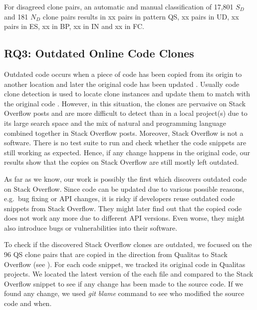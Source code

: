 \documentclass{sig-alternate-05-2015}
\begin{document}
For disagreed clone pairs, an automatic and manual classification of 17,801 $S_D$ and 181 $N_D$ clone pairs results in xx pairs in pattern QS, xx pairs in UD, xx pairs in ES, xx in BP, xx in IN and xx in FC. 

\subsection{RQ3: Outdated Online Code Clones}


Outdated code occurs when a piece of code has been copied from its origin to another location and later the original code has been updated \cite{Xia2014}. Usually code clone detection is used to locate clone instances and update them to match with the original code \cite{Bellon2007}. However, in this situation, the clones are pervasive on Stack Overflow posts and are more difficult to detect than in a local project(s) due to its large search space and the mix of natural and programming language combined together in Stack Overflow posts. Moreover, Stack Overflow is not a software. There is no test suite to run and check whether the code snippets are still working as expected. Hence, if any change happens in the original code, our results show that the copies on Stack Overflow are still mostly left outdated. 

As far as we know, our work is possibly the first which discovers outdated code on Stack Overflow. Since code can be updated due to various possible reasons, e.g.~bug fixing or API changes, it is risky if developers reuse outdated code snippets from Stack Overflow.
They might later find out that the copied code does not work any more due to different API versions. Even worse, they might also introduce bugs or vulnerabilities into their software. 

To check if the discovered Stack Overflow clones are outdated, we focused on the 96 QS clone pairs that are copied in the direction from Qualitas to Stack Overflow (see ). For each code snippet, we tracked its original code in Qualitas projects. We located the latest version of the each file and compared to the Stack Overflow snippet to see if any change has been made to the source code. If we found any change, we used \textit{git blame} command to see who modified the source code and when.
\end{document}
